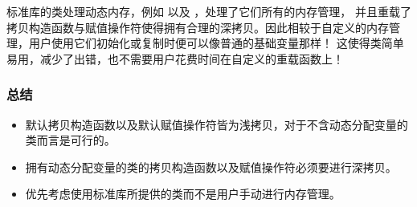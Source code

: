 \documentclass[../../LearnCpp.tex]{subfiles}
\begin{document}
标准库的类处理动态内存，例如  以及 ，处理了它们所有的内存管理，
并且重载了拷贝构造函数与赋值操作符使得拥有合理的深拷贝。因此相较于自定义的内存管理，用户使用它们初始化或复制时便可以像普通的基础变量那样！
这使得类简单易用，减少了出错，也不需要用户花费时间在自定义的重载函数上！

\subsubsection*{总结}

\begin{itemize}
  \item 默认拷贝构造函数以及默认赋值操作符皆为浅拷贝，对于不含动态分配变量的类而言是可行的。
  \item 拥有动态分配变量的类的拷贝构造函数以及赋值操作符必须要进行深拷贝。
  \item 优先考虑使用标准库所提供的类而不是用户手动进行内存管理。
\end{itemize}
\end{document}
